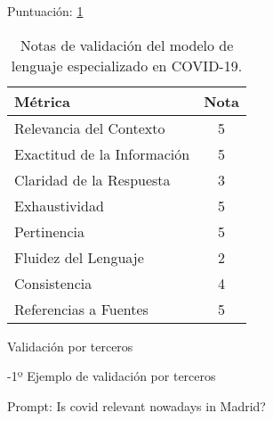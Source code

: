 Puntuación: \ref{tab:validation_scoresc1}

\begin{table}[h]
    \centering
    \begin{adjustbox}{max width=\textwidth}
    \begin{tabular}{|l|c|}
        \hline
        \textbf{Métrica} & \textbf{Nota} \\
        \hline
        Relevancia del Contexto & 5 \\
        \hline
        Exactitud de la Información & 5 \\
        \hline
        Claridad de la Respuesta & 3 \\
        \hline
        Exhaustividad & 5 \\
        \hline
        Pertinencia & 5 \\
        \hline
        Fluidez del Lenguaje & 2 \\
        \hline
        Consistencia & 4 \\
        \hline
        Referencias a Fuentes & 5 \\
        \hline
    \end{tabular}
    \end{adjustbox}
    \caption{Notas de validación del modelo de lenguaje especializado en COVID-19.}
    \label{tab:validation_scoresc1}
\end{table}


Validación por terceros

-1º Ejemplo de validación por terceros

Prompt: Is covid relevant nowadays in Madrid? 

